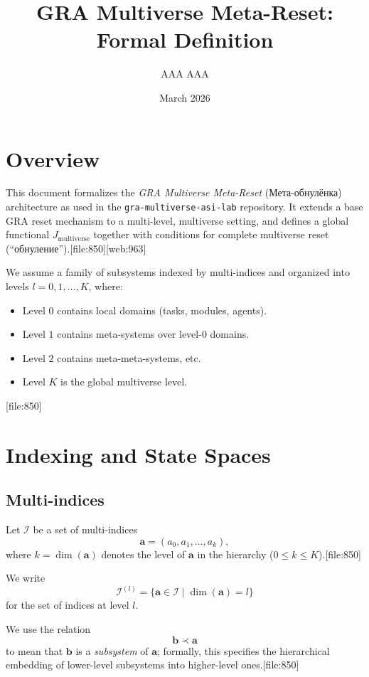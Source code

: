 \documentclass[12pt]{article}
\title{GRA Multiverse Meta-Reset: Formal Definition}
\author{AAA AAA}
\date{March 2026}
\begin{document}
\maketitle

\section{Overview}

This document formalizes the \emph{GRA Multiverse Meta-Reset} (Мета-обнулёнка)
architecture as used in the \texttt{gra-multiverse-asi-lab} repository.
It extends a base GRA reset mechanism to a multi-level, multiverse setting,
and defines a global functional $J_{\text{multiverse}}$ together with
conditions for complete multiverse reset (``обнуление'').[file:850][web:963]

We assume a family of subsystems indexed by multi-indices and organized
into levels $l = 0,1,\dots,K$, where:
\begin{itemize}
  \item Level $0$ contains local domains (tasks, modules, agents).
  \item Level $1$ contains meta-systems over level-$0$ domains.
  \item Level $2$ contains meta-meta-systems, etc.
  \item Level $K$ is the global multiverse level.
\end{itemize}[file:850]

\section{Indexing and State Spaces}

\subsection{Multi-indices}

Let $\mathcal{I}$ be a set of multi-indices
\[
\bm{a} = (a_0, a_1, \dots, a_k),
\]
where $k = \dim(\bm{a})$ denotes the level of $\bm{a}$ in the hierarchy
($0 \le k \le K$).[file:850]

We write
\[
\mathcal{I}^{(l)} = \{ \bm{a} \in \mathcal{I} \mid \dim(\bm{a}) = l \}
\]
for the set of indices at level $l$.

We use the relation
\[
\bm{b} \prec \bm{a}
\]
to mean that $\bm{b}$ is a \emph{subsystem} of $\bm{a}$; formally, this specifies
the hierarchical embedding of lower-level subsystems into higher-level ones.[file:850]
\end{document}
